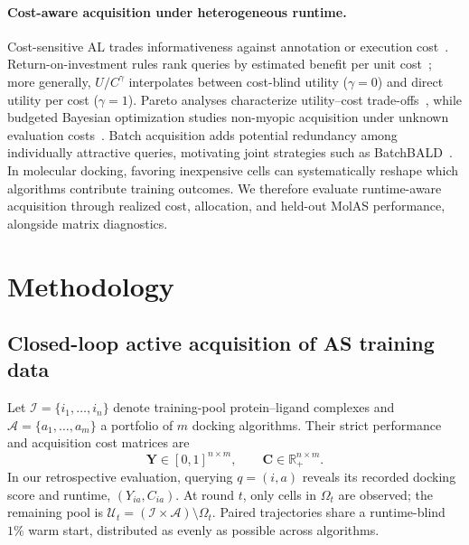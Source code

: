 \documentclass{article}
\begin{document}
\paragraph{Cost-aware acquisition under heterogeneous runtime.}
Cost-sensitive AL trades informativeness against annotation or execution cost~\citep{tomanek2010comparison,gao2020cost}. Return-on-investment rules rank queries by estimated benefit per unit cost~\citep{haertel2015analytic}; more generally, $U/C^\gamma$ interpolates between cost-blind utility ($\gamma=0$) and direct utility per cost ($\gamma=1$). Pareto analyses characterize utility--cost trade-offs~\citep{guinet2020pareto}, while budgeted Bayesian optimization studies non-myopic acquisition under unknown evaluation costs~\citep{astudillo2021multi}. Batch acquisition adds potential redundancy among individually attractive queries, motivating joint strategies such as BatchBALD~\citep{kirsch2019batchbald}. In molecular docking, favoring inexpensive cells can systematically reshape which algorithms contribute training outcomes. We therefore evaluate runtime-aware acquisition through realized cost, allocation, and held-out MolAS performance, alongside matrix diagnostics.

\section{Methodology}
\subsection{Closed-loop active acquisition of AS training data}
Let $\mathcal I=\{i_1,\ldots,i_n\}$ denote training-pool protein--ligand complexes and $\mathcal A=\{a_1,\ldots,a_m\}$ a portfolio of $m$ docking algorithms. Their strict performance and acquisition cost matrices are
\begin{equation}
\mathbf Y\in[0,1]^{n\times m},
\qquad
\mathbf C\in\mathbb R_{+}^{n\times m}.
\end{equation}
In our retrospective evaluation, querying $q=(i,a)$ reveals its recorded docking score and runtime, $(Y_{ia},C_{ia})$. At round $t$, only cells in $\Omega_t$ are observed; the remaining pool is $\mathcal U_t=(\mathcal I\times\mathcal A)\setminus\Omega_t$. Paired trajectories share a runtime-blind $1\%$ warm start, distributed as evenly as possible across algorithms.
\end{document}
